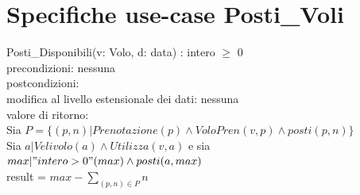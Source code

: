 \documentclass[a4paper,12pt]{report}
\begin{document}
      \newpage

      \section{Specifiche use-case Posti\_Voli}
        \hspace*{1cm}Posti\_Disponibili(v: Volo, d: data) : intero $\geq$ 0 \\
        \hspace*{2cm}precondizioni: nessuna \\
        \hspace*{2cm}postcondizioni: \\
        \hspace*{3cm}modifica al livello estensionale dei dati: nessuna \\
        \hspace*{3cm}valore di ritorno: \\
        \hspace*{4cm}Sia $P = \{(p, n) | Prenotazione(p) \wedge VoloPren(v, p) \wedge posti(p, n)\}$ \\
        \hspace*{4cm}Sia $a | Velivolo(a) \wedge Utilizza(v, a)$ e sia $max | "intero > 0"(max) \wedge posti(a, max)$ \\
        \hspace*{4cm}result = $max - \sum_{(p, n) \in P} n$ \\ \\
\end{document}

